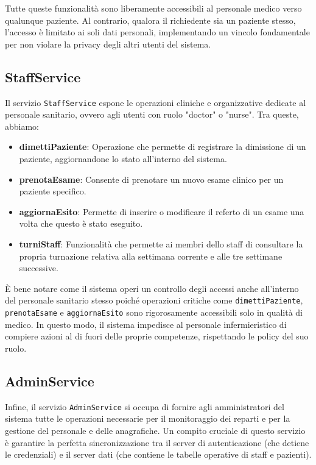 Tutte queste funzionalità sono liberamente accessibili al personale medico verso qualunque paziente. Al contrario, qualora il richiedente sia un paziente stesso, l'accesso è limitato ai soli dati personali, implementando un vincolo fondamentale per non violare la privacy degli altri utenti del sistema.

\subsection{StaffService}
Il servizio \texttt{StaffService} espone le operazioni cliniche e organizzative dedicate al personale sanitario, ovvero agli utenti con ruolo "doctor" o "nurse". Tra queste, abbiamo:
\begin{itemize}
    \item \textbf{dimettiPaziente}: Operazione che permette di registrare la dimissione di un paziente, aggiornandone lo stato all'interno del sistema.
    \item \textbf{prenotaEsame}: Consente di prenotare un nuovo esame clinico per un paziente specifico.
    \item \textbf{aggiornaEsito}: Permette di inserire o modificare il referto di un esame una volta che questo è stato eseguito.
    \item \textbf{turniStaff}: Funzionalità che permette ai membri dello staff di consultare la propria turnazione relativa alla settimana corrente e alle tre settimane successive.
\end{itemize}

È bene notare come il sistema operi un controllo degli accessi anche all'interno del personale sanitario stesso poiché operazioni critiche come \texttt{dimettiPaziente}, \texttt{prenotaEsame} e \texttt{aggiornaEsito} sono rigorosamente accessibili solo in qualità di medico. In questo modo, il sistema impedisce al personale infermieristico di compiere azioni al di fuori delle proprie competenze, rispettando le policy del suo ruolo.

\subsection{AdminService}
Infine, il servizio \texttt{AdminService} si occupa di fornire agli amministratori del sistema tutte le operazioni necessarie per il monitoraggio dei reparti e per la gestione del personale e delle anagrafiche. Un compito cruciale di questo servizio è garantire la perfetta sincronizzazione tra il server di autenticazione (che detiene le credenziali) e il server dati (che contiene le tabelle operative di staff e pazienti). 

